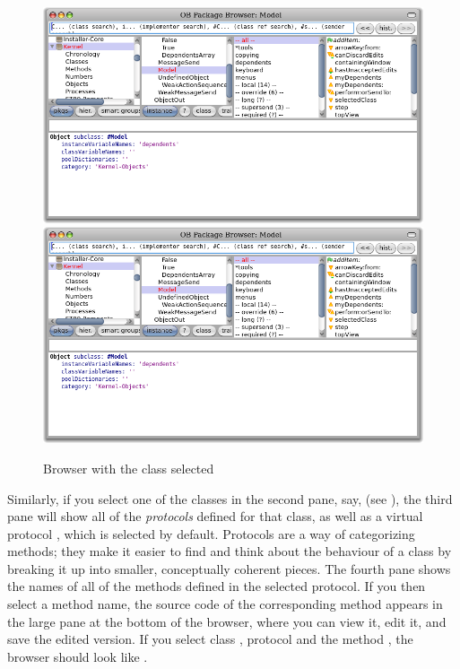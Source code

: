 \documentclass[a4paper,10pt,twoside]{book}
\begin{document}
\begin{figure}[htbp]
   \centering
   \ifluluelse
	   {\includegraphics[width=\textwidth]{SystemBrowser1} }
	   {\includegraphics[width=.7\textwidth]{SystemBrowser1} }
   \caption{Browser with the class  selected
   }
\end{figure}

Similarly, if you select one of the classes in the second pane, say,  (see  ), the third pane will show all of the \emph{protocols} defined for that class, as well as a virtual protocol , which is selected by default. 
Protocols are a way of categorizing methods; they make it easier to find and think about the behaviour of a class by breaking it up into smaller, conceptually coherent pieces.  
The fourth pane shows the names of all of the methods defined in the selected protocol.
If you then select a method name, the source code of the corresponding method appears in the large pane at the bottom of the browser, where you can view it, edit it, and save the edited version.
If you select class ,  protocol  and the method , the browser should look like .
\end{document}
